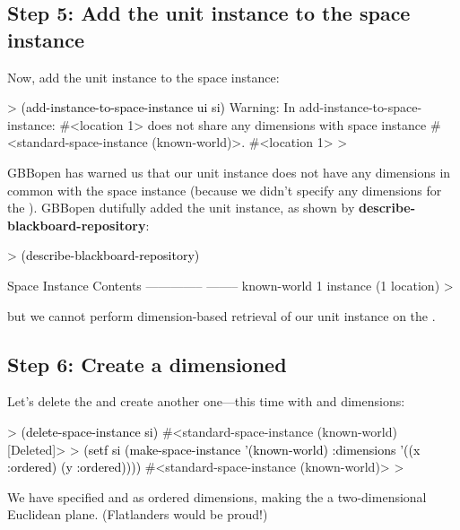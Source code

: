 \documentclass[10pt,twoside,english,pdftex]{article}
\begin{document}
\subsection*{Step 5: Add the unit instance to the space instance}

%
Now, add the  unit instance to the space instance:
%
\begin{example}\color{darkergray}%
  > \textcolor{black}{(add-instance-to-space-instance ui si)}
  Warning: In add-instance-to-space-instance: #<location 1>
           does not share any dimensions with space instance 
           #<standard-space-instance (known-world)>.
  #<location 1>
  >
\end{example}

%
GBBopen has warned us that our  unit instance does not
have any dimensions in common with the  space
instance (because we didn't specify any dimensions for the
).  GBBopen dutifully added the unit instance, as
shown by \textbf{describe-blackboard-repository}:
%
\begin{example}\color{darkergray}%
  > \textcolor{black}{(describe-blackboard-repository)}
  
  Space Instance                Contents
  --------------                --------
  known-world                   1 instance (1 location)
  >
\end{example}
%
but we cannot perform dimension-based retrieval of our 
unit instance on the .

\subsection*{Step 6: Create a dimensioned }

%
%
Let's delete the  and create another one---this time
with  and  dimensions:
%
\begin{example}\color{darkergray}%
  > \textcolor{black}{(delete-space-instance si)}
  #<standard-space-instance (known-world) [Deleted]>
  > \textcolor{black}{(setf si (make-space-instance '(known-world)
              :dimensions '((x :ordered) (y :ordered))))}
  #<standard-space-instance (known-world)>
  >
\end{example}
%
We have specified  and  as ordered dimensions, making the
 a two-dimensional Euclidean plane.  (Flatlanders would be
proud!)
\end{document}
